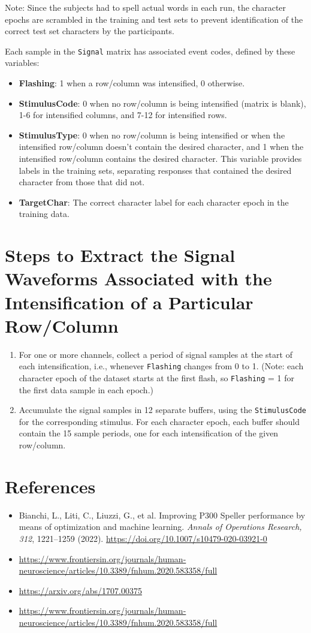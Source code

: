 \documentclass{article}
\begin{document}
Note: Since the subjects had to spell actual words in each run, the character epochs are scrambled in the training and test sets to prevent identification of the correct test set characters by the participants.

Each sample in the \texttt{Signal} matrix has associated event codes, defined by these variables:
\begin{itemize}
    \item \textbf{Flashing}: 1 when a row/column was intensified, 0 otherwise.
    \item \textbf{StimulusCode}: 0 when no row/column is being intensified (matrix is blank), 1-6 for intensified columns, and 7-12 for intensified rows.
    \item \textbf{StimulusType}: 0 when no row/column is being intensified or when the intensified row/column doesn't contain the desired character, and 1 when the intensified row/column contains the desired character. This variable provides labels in the training sets, separating responses that contained the desired character from those that did not.
    \item \textbf{TargetChar}: The correct character label for each character epoch in the training data.
\end{itemize}

\section{Steps to Extract the Signal Waveforms Associated with the Intensification of a Particular Row/Column}
\begin{enumerate}
    \item For one or more channels, collect a period of signal samples at the start of each intensification, i.e., whenever \texttt{Flashing} changes from 0 to 1. (Note: each character epoch of the dataset starts at the first flash, so \texttt{Flashing} = 1 for the first data sample in each epoch.)
    \item Accumulate the signal samples in 12 separate buffers, using the \texttt{StimulusCode} for the corresponding stimulus. For each character epoch, each buffer should contain the 15 sample periods, one for each intensification of the given row/column.
\end{enumerate}

\section{References}
\begin{itemize}
    \item Bianchi, L., Liti, C., Liuzzi, G., et al. Improving P300 Speller performance by means of optimization and machine learning. \emph{Annals of Operations Research, 312}, 1221–1259 (2022). \url{https://doi.org/10.1007/s10479-020-03921-0}
    \item \url{https://www.frontiersin.org/journals/human-neuroscience/articles/10.3389/fnhum.2020.583358/full}
    \item \url{https://arxiv.org/abs/1707.00375}
    \item \url{https://www.frontiersin.org/journals/human-neuroscience/articles/10.3389/fnhum.2020.583358/full}
\end{itemize}
\end{document}

